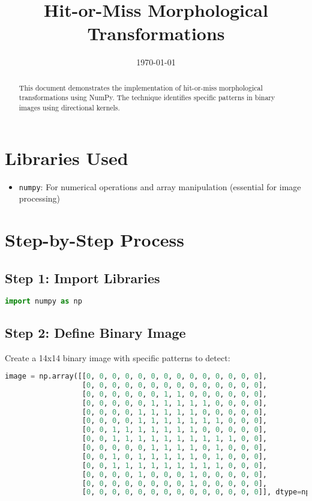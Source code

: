 \documentclass[12pt]{article}
\title{Hit-or-Miss Morphological Transformations}
\date{\today}
\begin{document}
\maketitle

\begin{abstract}
This document demonstrates the implementation of hit-or-miss morphological transformations using NumPy. The technique identifies specific patterns in binary images using directional kernels.
\end{abstract}

\section{Libraries Used}
\begin{itemize}
    \item \texttt{numpy}: For numerical operations and array manipulation (essential for image processing)
\end{itemize}

\section{Step-by-Step Process}

\subsection{Step 1: Import Libraries}
\begin{lstlisting}[language=Python]
import numpy as np
\end{lstlisting}

\subsection{Step 2: Define Binary Image}
Create a 14x14 binary image with specific patterns to detect:

\begin{lstlisting}[language=Python]
image = np.array([[0, 0, 0, 0, 0, 0, 0, 0, 0, 0, 0, 0, 0, 0],
                  [0, 0, 0, 0, 0, 0, 0, 0, 0, 0, 0, 0, 0, 0],
                  [0, 0, 0, 0, 0, 0, 1, 1, 0, 0, 0, 0, 0, 0],
                  [0, 0, 0, 0, 0, 1, 1, 1, 1, 1, 0, 0, 0, 0],
                  [0, 0, 0, 0, 1, 1, 1, 1, 1, 0, 0, 0, 0, 0],
                  [0, 0, 0, 0, 1, 1, 1, 1, 1, 1, 1, 0, 0, 0],
                  [0, 0, 1, 1, 1, 1, 1, 1, 1, 0, 0, 0, 0, 0],
                  [0, 0, 1, 1, 1, 1, 1, 1, 1, 1, 1, 1, 0, 0],
                  [0, 0, 0, 0, 0, 1, 1, 1, 1, 0, 1, 0, 0, 0],
                  [0, 0, 1, 0, 1, 1, 1, 1, 1, 0, 1, 0, 0, 0],
                  [0, 0, 1, 1, 1, 1, 1, 1, 1, 1, 1, 0, 0, 0],
                  [0, 0, 0, 0, 1, 0, 0, 0, 1, 0, 0, 0, 0, 0],
                  [0, 0, 0, 0, 0, 0, 0, 0, 1, 0, 0, 0, 0, 0],
                  [0, 0, 0, 0, 0, 0, 0, 0, 0, 0, 0, 0, 0, 0]], dtype=np.int8)
\end{lstlisting}
\end{document}
